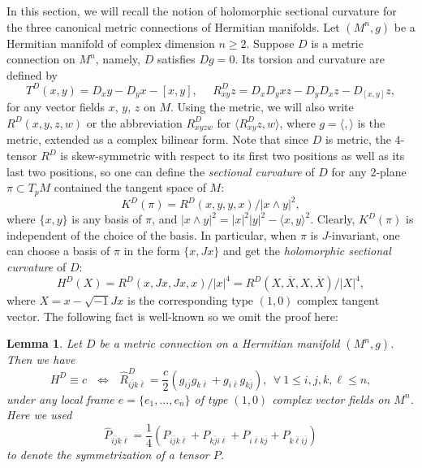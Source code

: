 \documentclass{amsart}
\newtheorem{lemma}{Lemma}
\numberwithin{equation}{section}
\begin{document}
In this section, we will recall the notion of holomorphic sectional curvature for the three canonical metric connections of Hermitian manifolds. Let $(M^n,g)$ be a Hermitian manifold of complex dimension $n\geq 2$. Suppose $D$ is a metric connection on $M^n$, namely, $D$ satisfies $Dg=0$. Its torsion and curvature are defined by
$$ T^D(x,y)=D_xy-D_yx-[x,y], \ \ \ \ \ \ R^D_{xy}z=D_xD_yxz-D_yD_xz -D_{[x,y]}z, $$
for any vector fields $x$, $y$, $z$ on $M$. Using the metric, we will also write $R^D(x,y,z,w)$ or the abbreviation $R^D_{xyzw}$ for $\langle R^D_{xy}z, w\rangle$, where $g=\langle , \rangle$ is the metric, extended as a complex bilinear form. Note that since $D$ is metric, the $4$-tensor $R^D$ is skew-symmetric with respect to its first two positions as well as its last two positions, so one can define the {\em sectional curvature} of $D$ for any $2$-plane $\pi \subset T_pM$ contained the tangent space of $M$:
\begin{equation*}
K^D(\pi ) = R^D(x,y,y,x)/ |x\wedge y|^2,
\end{equation*}
where $\{x,y\}$ is any basis of $\pi$, and $|x\wedge y|^2 =|x|^2|y|^2 - \langle x,y\rangle^2$. Clearly, $K^D(\pi)$ is independent of the choice of the basis. In particular, when $\pi$ is $J$-invariant, one can choose a basis of $\pi$ in the form $\{ x,Jx\}$ and get the  {\em holomorphic sectional curvature} of $D$:
\begin{equation}
H^D(X) = R^D(x,Jx,Jx,x)/ |x|^4 = R^D(X,\overline{X}, X, \overline{X})/|X|^4,
\end{equation}
where $X=x-\sqrt{-1}Jx$ is the corresponding type $(1,0)$ complex tangent vector. The following fact is well-known so we omit the proof here:
\begin{lemma}\label{lemma1}
Let \(D\) be a  metric connection on a Hermitian manifold \((M^n,g)\).  Then
we have
\begin{equation}\label{eq:H=c}
H^D\equiv c   \ \ \ \Longleftrightarrow \ \ \ \widehat R^D_{i\bar j k\bar\ell}
 =\frac{c}{2}
 \left(g_{i\bar{j}}g_{k\bar{\ell}}
      +g_{i\bar{\ell}}g_{k\bar{j}}\right), \ \ \forall \ 1\leq i,j,k,\ell \leq n,
\end{equation}
under any local frame $e=\{ e_1, \ldots , e_n\}$ of type $(1,0)$ complex vector fields on $M^n$. Here we used
\begin{equation}\label{eq:sym}
 \widehat P_{i\bar j k\bar\ell}
 =\frac14\left(
 P_{i\bar j k\bar\ell}
 +P_{k\bar j i\bar\ell}
 +P_{i\bar\ell k\bar j}
 +P_{k\bar\ell i\bar j}\right)
\end{equation}
to denote the symmetrization of a tensor $P$.
\end{lemma}
\end{document}
